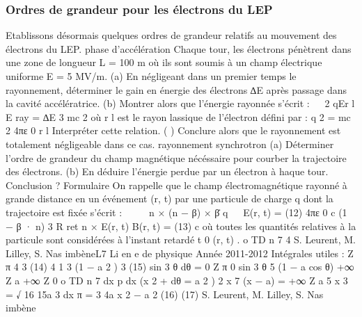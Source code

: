 \subsubsection{Ordres de grandeur pour les électrons du LEP}%
Etablissons désormais quelques ordres de grandeur relatifs au mouvement des électrons du
LEP.
phase d'accélération
Chaque tour, les électrons pénètrent dans une zone de longueur L = 100 m où ils sont soumis
à un champ électrique uniforme E = 5 MV/m.
(a) En négligeant dans un premier temps le rayonnement, déterminer le gain en énergie des
électrons ∆E après passage dans la cavité accélératrice.
(b) Montrer alors que l'énergie rayonnée s'écrit :


2 qEr l
E ray =
∆E
3 mc 2
où r l est le rayon lassique de l'électron défini par :
q 2
= mc 2
4πε 0 r l
Interpréter cette relation.
( ) Conclure alors que le rayonnement est totalement négligeable dans ce cas.
rayonnement synchrotron
(a) Déterminer l'ordre de grandeur du champ magnétique nécéssaire pour courber la trajectoire
des électrons.
(b) En déduire l'énergie perdue par un électron à haque tour. Conclusion ?
Formulaire
On rappelle que le champ électromagnétique rayonné à grande distance en un événement (r, t)
par une particule de charge q dont la trajectoire est fixée s'écrit :

 

n
×
(n
−
β)
×
β̇
q 

E(r, t) =
(12)
4πε 0 c
(1 − β · n) 3 R
ret
n × E(r, t)
B(r, t) =
(13)
c
où toutes les quantités relatives à la particule sont considérées à l'instant retardé t 0 (r, t) .
o
TD n 7
4
S. Leurent, M. Lilley, S. Nas imbèneL7
Li en e de physique
Année 2011-2012
Intégrales utiles :
Z π
4
3 (14)
4
1
3 (1 − a 2 ) 3 (15)
sin 3 θ dθ =
0
Z π
0
sin 3 θ
5
(1 − a cos θ)
+∞
Z
a
+∞
Z
0
o
TD n 7
dx
p
dx
(x 2 +
dθ =
a 2 ) 2
x 7 (x − a)
=
+∞
Z
a
5
x 3
=
√
16
15a 3
dx
π
= 3
4a
x 2 − a 2
(16)
(17)
S. Leurent, M. Lilley, S. Nas imbène
